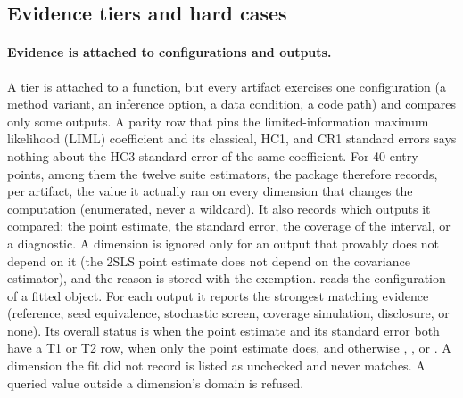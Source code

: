 \begin{table}[!ht]
\centering\scriptsize
\resizebox{\textwidth}{!}{%
}
\caption{Selected rows on original public extracts. All 
references read the same CSV as \statspai{}. The Published column is for
context, not a parity target: an original-paper value (Card's is from a
longer specification, Section~\ref{sec:ex-card}), a vignette value, a
textbook output, or a rounded extract value. The comparison is the
\statspai{}-- pair in the Note column. These rows are not
graded. Rows marked \(^{\ddagger}\) fit their propensity or outcome
regression with .}
\label{tab:headline-parity}
\end{table}

\subsection{Evidence tiers and hard cases}\label{sec:validation-tiers}

\paragraph{Evidence is attached to configurations and outputs.}
A tier is attached to a function, but every artifact exercises one
configuration (a method variant, an inference option, a data condition,
a code path) and compares only some outputs. A parity row that pins the limited-information maximum likelihood (LIML) coefficient and its classical,
HC1, and CR1 standard errors says nothing about the HC3 standard error
of the same coefficient. For 40 entry points, among them the twelve suite estimators, the package
therefore records, per artifact, the value it actually ran on every
dimension that changes the computation (enumerated, never a wildcard).
It also records which outputs it compared: the point estimate, the
standard error, the coverage of the interval, or a diagnostic. A
dimension is ignored only for an output that provably does not depend
on it (the 2SLS point estimate does not depend on the covariance
estimator), and the reason is stored with the exemption.
 reads the configuration of a fitted
object. For each output it reports the strongest matching evidence
(reference, seed equivalence, stochastic screen, coverage simulation,
disclosure, or none). Its overall status is  when the
point estimate and its standard error both have a T1 or T2 row,
 when only the point estimate does, and otherwise
, , or . A dimension the fit did
not record is listed as unchecked and never matches. A queried value
outside a dimension's domain is refused.

